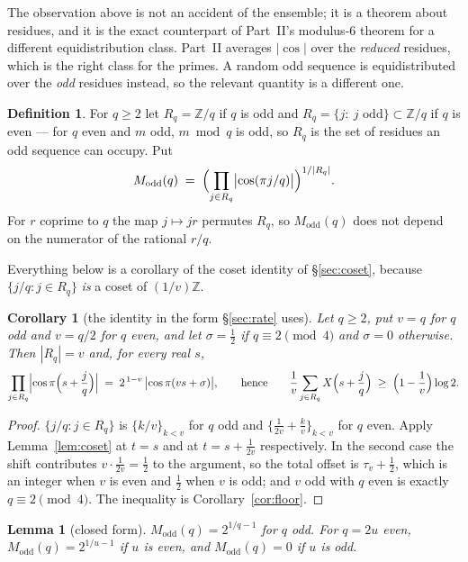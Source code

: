 \documentclass[11pt,a4paper]{article}
\theoremstyle{plain}
\newtheorem{lemma}[theorem]{Lemma}
\newtheorem{corollary}[theorem]{Corollary}
\theoremstyle{definition}
\newtheorem{definition}[theorem]{Definition}
\theoremstyle{remark}
\begin{document}
The observation above is not an accident of the ensemble; it is a theorem about residues, and
it is the exact counterpart of Part~II's modulus-$6$ theorem for a different equidistribution
class. Part~II averages $|\cos|$ over the \emph{reduced} residues, which is the right class
for the primes. A random odd sequence is equidistributed over the \emph{odd} residues
instead, so the relevant quantity is a different one.

\begin{definition}\label{def:modd}
For $q\ge2$ let $R_q=\mathbb{Z}/q$ if $q$ is odd and $R_q=\{j:\ j\text{ odd}\}\subset
\mathbb{Z}/q$ if $q$ is even --- for $q$ even and $m$ odd, $m\bmod q$ is odd, so $R_q$ is the
set of residues an odd sequence can occupy. Put
\[
   M_{\mathrm{odd}}(q)\;=\;\Bigl(\prod_{j\in R_q}\bigl|\cos(\pi j/q)\bigr|\Bigr)^{1/|R_q|}.
\]
For $r$ coprime to $q$ the map $j\mapsto jr$ permutes $R_q$, so $M_{\mathrm{odd}}(q)$ does not
depend on the numerator of the rational $r/q$.
\end{definition}

Everything below is a corollary of the coset identity of \S\ref{sec:coset}, because
$\{j/q:j\in R_q\}$ \emph{is} a coset of $(1/v)\mathbb{Z}$.

\begin{corollary}[the identity in the form \S\ref{sec:rate} uses]\label{cor:cosetRq}
Let $q\ge2$, put $v=q$ for $q$ odd and $v=q/2$ for $q$ even, and let $\sigma=\tfrac12$ if
$q\equiv2\pmod 4$ and $\sigma=0$ otherwise. Then $|R_q|=v$ and, for every real $s$,
\[
   \prod_{j\in R_q}\Bigl|\cos\pi\Bigl(s+\frac jq\Bigr)\Bigr|
   \;=\;2^{\,1-v}\,\bigl|\cos\pi(vs+\sigma)\bigr| ,\qquad\text{hence}\qquad
   \frac1v\sum_{j\in R_q}X\Bigl(s+\frac jq\Bigr)\;\ge\;\Bigl(1-\frac1v\Bigr)\log2 .
\]
\end{corollary}

\begin{proof}
$\{j/q:j\in R_q\}$ is $\{k/v\}_{k<v}$ for $q$ odd and $\{\tfrac1{2v}+\tfrac kv\}_{k<v}$ for $q$
even. Apply Lemma~\ref{lem:coset} at $t=s$ and at $t=s+\tfrac1{2v}$ respectively. In the second
case the shift contributes $v\cdot\tfrac1{2v}=\tfrac12$ to the argument, so the total offset is
$\tau_v+\tfrac12$, which is an integer when $v$ is even and $\tfrac12$ when $v$ is odd; and $v$
odd with $q$ even is exactly $q\equiv2\pmod4$. The inequality is
Corollary~\ref{cor:floor}.
\end{proof}

\begin{lemma}[closed form]\label{lem:moddclosed}
$M_{\mathrm{odd}}(q)=2^{1/q-1}$ for $q$ odd. For $q=2u$ even,
$M_{\mathrm{odd}}(q)=2^{1/u-1}$ if $u$ is even, and $M_{\mathrm{odd}}(q)=0$ if $u$ is odd.
\end{lemma}
\end{document}
